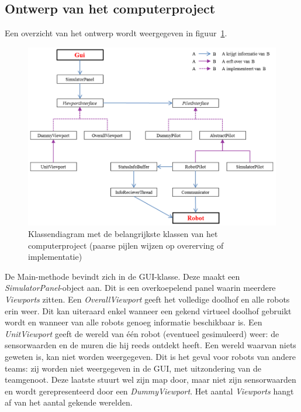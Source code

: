 \documentclass[tt3]{penoverslag}
\begin{document}
\subsection{Ontwerp van het computerproject}
\label{ssec:Sdesign}
Een overzicht van het ontwerp wordt weergegeven in figuur~\ref{fig:klasSoft}.\\

\begin{figure}
\centering
		\includegraphics[width=\textwidth]{KlasSoftware}
\caption[Klassendiagram computerproject]{Klassendiagram met de belangrijkste klassen van het computerproject (paarse pijlen wijzen op overerving of implementatie)}
\label{fig:klasSoft}
\end{figure}

De Main-methode bevindt zich in de GUI-klasse. Deze maakt een \textit{SimulatorPanel}-object aan. Dit is een overkoepelend panel waarin meerdere \textit{Viewports} zitten. Een \textit{OverallViewport} geeft het volledige doolhof en alle robots erin weer. Dit kan uiteraard enkel wanneer een gekend virtueel doolhof gebruikt wordt en wanneer van alle robots genoeg informatie beschikbaar is. Een \textit{UnitViewport} geeft de wereld van \'e\'en robot (eventueel gesimuleerd) weer: de sensorwaarden en de muren die hij reeds ontdekt heeft. Een wereld waarvan niets geweten is, kan niet worden weergegeven. Dit is het geval voor robots van andere teams: zij worden niet weergegeven in de GUI, met uitzondering van de teamgenoot. Deze laatste stuurt wel zijn map door, maar niet zijn sensorwaarden en wordt gerepresenteerd door een \textit{DummyViewport}. Het aantal \textit{Viewports} hangt af van het aantal gekende werelden.\\
\end{document}
